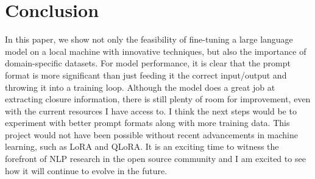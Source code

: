 \documentclass[12pt]{article}
\begin{document}
\section{Conclusion}
In this paper, we show not only the feasibility of fine-tuning a large language model on a local machine with innovative techniques, but also the importance of domain-specific datasets. For model performance, it is clear that the prompt format is more significant than just feeding it the correct input/output and throwing it into a training loop. Although the model does a great job at extracting closure information, there is still plenty of room for improvement, even with the current resources I have access to. I think the next steps would be to experiment with better prompt formats along with more training data. This project would not have been possible without recent advancements in machine learning, such as LoRA and QLoRA. It is an exciting time to witness the forefront of NLP research in the open source community and I am excited to see how it will continue to evolve in the future.
\newpage


\end{document}
